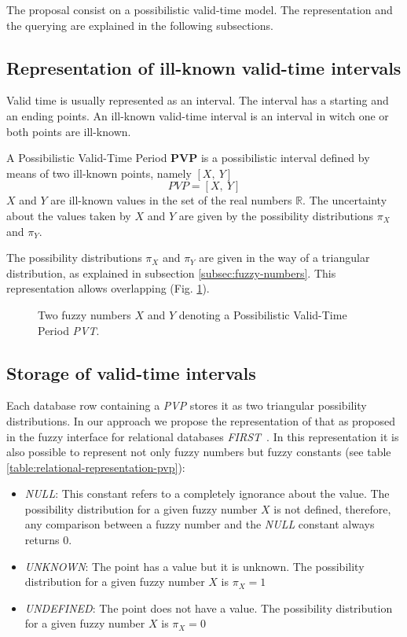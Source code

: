 The proposal consist on a possibilistic valid-time model. The representation and the querying are explained in the following subsections.

\subsection{Representation of ill-known valid-time intervals}
Valid time is usually represented as an interval. The interval has a starting and an ending points. An ill-known valid-time interval is an interval in witch one or both points are ill-known. 

\begin{definition}
A Possibilistic Valid-Time Period \textbf{PVP} is a possibilistic interval defined by means of two ill-known points, namely $\left[ X,\ Y \right]$
\begin{equation}
PVP = \left[X,\ Y \right] 
\end{equation}
$X$ and $Y$ are ill-known values in the set of the real numbers $\mathbb{R}$. The uncertainty about the values taken by $X$ and $Y$ are given by the possibility distributions $\pi_X$ and $\pi_Y$.
\end{definition}

The possibility distributions $\pi_X$ and $\pi_Y$ are given in the way of a triangular distribution, as explained in subsection \ref{subsec:fuzzy-numbers}. This representation allows overlapping (Fig. \ref{fig:pvp}).


\begin{figure}[h!]
  \centering
  \caption{Two fuzzy numbers $X$ and $Y$ denoting a Possibilistic Valid-Time Period \emph{PVT}.}
  \label{fig:pvp}
\end{figure}

\subsection{Storage of valid-time intervals}
Each database row containing a \emph{PVP} stores it as two triangular possibility distributions. In our approach we propose the representation of that as proposed in the  fuzzy interface for relational databases \emph{FIRST}~\cite{Medina94gefred.a,Gal98}. In this representation it is also possible to represent not only fuzzy numbers but fuzzy constants (see table \ref{table:relational-representation-pvp}):

\begin{itemize}
\item
\emph{NULL}: This constant refers to a completely ignorance about the value. The possibility distribution for a given fuzzy number $X$ is not defined, therefore, any comparison between a fuzzy number and the \emph{NULL} constant always returns $0$.
\item
\emph{UNKNOWN}: The point has a value but it is unknown. The possibility distribution for a given fuzzy number $X$ is $\pi_X=1$
\item
\emph{UNDEFINED}: The point does not have a value. The possibility distribution for a given fuzzy number $X$ is $\pi_X=0$
\end{itemize}


